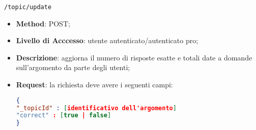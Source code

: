 \item \texttt{/topic/update}
		\begin{itemize}
			\item \textbf{Method}: POST;
			\item \textbf{Livello di Acccesso}: utente autenticato/autenticato pro;
			\item \textbf{Descrizione}: aggiorna il numero di risposte esatte e totali date a domande sull'argomento da parte degli utenti;
			\item \textbf{Request}: la richiesta deve avere i seguenti campi:
\begin{lstlisting}[language=json,firstnumber=1]
{
"_topicId" : [identificativo dell'argomento]
"correct" : [true | false]
}
\end{lstlisting}
		\end{itemize}
